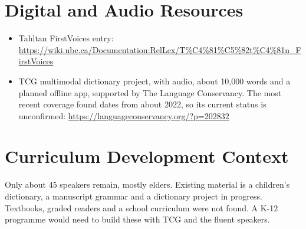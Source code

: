 \documentclass[12pt]{article}
\begin{document}
\section{Digital and Audio Resources}
\begin{itemize}
\item Tahltan FirstVoices entry: \url{https://wiki.ubc.ca/Documentation:RelLex/T%C4%81%C5%82t%C4%81n_FirstVoices}
\item TCG multimodal dictionary project, with audio, about 10,000 words and a planned offline app, supported by The Language Conservancy. The most recent coverage found dates from about 2022, so its current status is unconfirmed: \url{https://languageconservancy.org/?p=202832}
\end{itemize}

\section{Curriculum Development Context}
Only about 45 speakers remain, mostly elders. Existing material is a children's dictionary, a manuscript grammar and a dictionary project in progress. Textbooks, graded readers and a school curriculum were not found. A K-12 programme would need to build these with TCG and the fluent speakers.
\end{document}
